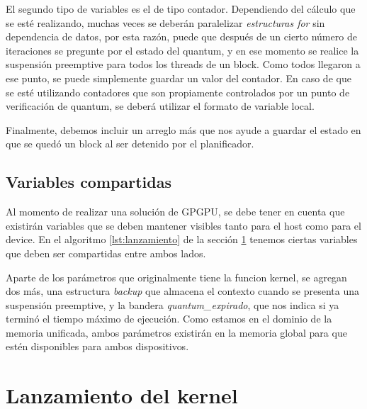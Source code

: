 El segundo tipo de variables es el de tipo contador. Dependiendo del cálculo que se esté realizando, muchas veces se deberán paralelizar \textit{estructuras for} sin dependencia de datos, por esta razón, puede que después de un cierto número de iteraciones se pregunte por el estado del quantum, y en ese momento se realice la suspensión preemptive para todos los threads de un block. Como todos llegaron a ese punto, se puede simplemente guardar un valor del contador. En caso de que se esté utilizando contadores que son propiamente controlados por un punto de verificación de quantum, se deberá utilizar el formato de variable local.
\newline

Finalmente, debemos incluir un arreglo más que nos ayude a guardar el estado en que se quedó un block al ser detenido por el planificador.



  \subsection{Variables compartidas}
  
  Al momento de realizar una solución de GPGPU, se debe tener en cuenta que existirán variables que se deben mantener visibles tanto para el host como para el device. En el algoritmo \ref{lst:lanzamiento} de la sección \ref{secc:lanzamientoKernel} tenemos ciertas variables que deben ser compartidas entre ambos lados. 
    \newline
  
  Aparte de los parámetros que originalmente tiene la funcion kernel, se agregan dos más, una estructura \textit{backup} que almacena el contexto cuando se presenta una suspensión preemptive, y la bandera \textit{quantum\_expirado}, que nos indica si ya terminó el tiempo máximo de ejecución. Como estamos en el dominio de la memoria unificada, ambos parámetros existirán en la memoria global para que estén disponibles para ambos dispositivos.
  
  

\section{Lanzamiento del kernel}\label{secc:lanzamientoKernel}


